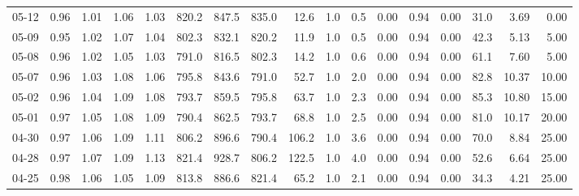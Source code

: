 \begin{threeparttable}
{\begin{tabular}{lrrrrrrrrrrrrrrrr}
  05-12 &         0.96 &           1.01 &          1.06 &          1.03 & 820.2 & 847.5 & 835.0 &       12.6 &                      1.0 &                 0.5 &       0.00 &      0.94 &           0.00 &             31.0 &            3.69 &                   0.00 \\
  05-09 &         0.95 &           1.02 &          1.07 &          1.04 & 802.3 & 832.1 & 820.2 &       11.9 &                      1.0 &                 0.5 &       0.00 &      0.94 &           0.00 &             42.3 &            5.13 &                   5.00 \\
  05-08 &         0.96 &           1.02 &          1.05 &          1.03 & 791.0 & 816.5 & 802.3 &       14.2 &                      1.0 &                 0.6 &       0.00 &      0.94 &           0.00 &             61.1 &            7.60 &                   5.00 \\
  05-07 &         0.96 &           1.03 &          1.08 &          1.06 & 795.8 & 843.6 & 791.0 &       52.7 &                      1.0 &                 2.0 &       0.00 &      0.94 &           0.00 &             82.8 &           10.37 &                  10.00 \\
  05-02 &         0.96 &           1.04 &          1.09 &          1.08 & 793.7 & 859.5 & 795.8 &       63.7 &                      1.0 &                 2.3 &       0.00 &      0.94 &           0.00 &             85.3 &           10.80 &                  15.00 \\
  05-01 &         0.97 &           1.05 &          1.08 &          1.09 & 790.4 & 862.5 & 793.7 &       68.8 &                      1.0 &                 2.5 &       0.00 &      0.94 &           0.00 &             81.0 &           10.17 &                  20.00 \\
  04-30 &         0.97 &           1.06 &          1.09 &          1.11 & 806.2 & 896.6 & 790.4 &      106.2 &                      1.0 &                 3.6 &       0.00 &      0.94 &           0.00 &             70.0 &            8.84 &                  25.00 \\
  04-28 &         0.97 &           1.07 &          1.09 &          1.13 & 821.4 & 928.7 & 806.2 &      122.5 &                      1.0 &                 4.0 &       0.00 &      0.94 &           0.00 &             52.6 &            6.64 &                  25.00 \\
  04-25 &         0.98 &           1.06 &          1.05 &          1.09 & 813.8 & 886.6 & 821.4 &       65.2 &                      1.0 &                 2.1 &       0.00 &      0.94 &           0.00 &             34.3 &            4.21 &                  25.00 \\

\end{tabular}}
\end{threeparttable}
